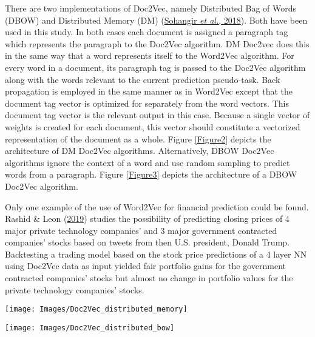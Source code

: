 \documentclass[11pt,preprint, authoryear]{elsarticle}
\let\origfigure\figure
\let\endorigfigure\endfigure
\renewenvironment{figure}[1][2] {
    \expandafter\origfigure\expandafter[H]
} {
    \endorigfigure
}
\numberwithin{equation}{section}
\numberwithin{figure}{section}
\numberwithin{table}{section}
\begin{document}
There are two implementations of Doc2Vec, namely Distributed Bag of
Words (DBOW) and Distributed Memory (DM)
(\protect\hyperlink{ref-sohangir2018financial}{Sohangir \emph{et al.},
2018}). Both have been used in this study. In both cases each document
is assigned a paragraph tag which represents the paragraph to the
Doc2Vec algorithm. DM Doc2vec does this in the same way that a word
represents itself to the Word2Vec algorithm. For every word in a
document, its paragraph tag is passed to the Doc2Vec algorithm along
with the words relevant to the current prediction pseudo-task. Back
propagation is employed in the same manner as in Word2Vec except that
the document tag vector is optimized for separately from the word
vectors. This document tag vector is the relevant output in this case.
Because a single vector of weights is created for each document, this
vector should constitute a vectorized representation of the document as
a whole. Figure \ref{Figure2} depicts the architecture of DM Doc2Vec
algorithms. Alternatively, DBOW Doc2Vec algorithms ignore the context of
a word and use random sampling to predict words from a paragraph. Figure
\ref{Figure3} depicts the architecture of a DBOW Doc2Vec algorithm.

Only one example of the use of Word2Vec for financial prediction could
be found. Rashid \& Leon
(\protect\hyperlink{ref-rashid2019making}{2019}) studies the possibility
of predicting closing prices of 4 major private technology companies'
and 3 major government contracted companies' stocks based on tweets from
then U.S. president, Donald Trump. Backtesting a trading model based on
the stock price predictions of a 4 layer NN using Doc2Vec data as input
yielded fair portfolio gains for the government contracted companies'
stocks but almost no change in portfolio values for the private
technology companies' stocks.

\begin{figure}[H]

{\centering \texttt{[image: Images/Doc2Vec\_distributed\_memory]} 

}

\caption{Doc2Vec model - distributed memory architecture: dm = 1 \label{Figure2}}\label{fig:Doc2Vec DM}
\end{figure}

\begin{figure}[H]

{\centering \texttt{[image: Images/Doc2Vec\_distributed\_bow]} 

}

\caption{Doc2Vec model - distributed bag of words architecture: dm = 0 \label{Figure3}}\label{fig:Doc2Vec DBOW}
\end{figure}
\end{document}
